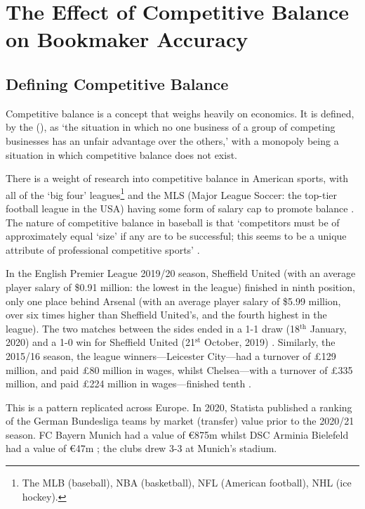 \documentclass[a4paper,10pt]{report}
\begin{document}
\section{The Effect of Competitive Balance on Bookmaker Accuracy}\label{sec:elitecompbal}

\subsection{Defining Competitive Balance}
Competitive balance is a concept that weighs heavily on economics. It is defined, by the \citeauthor{CompetitiveBalance} (\citeyear{CompetitiveBalance}), as `the situation in which no one business of a group of competing businesses has an unfair advantage over the others,' with a monopoly being a situation in which competitive balance does not exist.

There is a weight of research into competitive balance in American sports, with all of the `big four' leagues\footnote{The MLB (baseball), NBA (basketball), NFL (American football), NHL (ice hockey).} and the MLS (Major League Soccer: the top-tier football league in the USA) having some form of salary cap to promote balance \autocite{MLBsalary, NBAsalary, NHLsalary, NFLsalary, MLSsalary}. The nature of competitive balance in baseball is that `competitors must be of approximately equal `size' if any are to be successful; this seems to be a unique attribute of professional competitive sports' \autocite{Rottenberg56}. 


In the English Premier League 2019/20 season, Sheffield United (with an average player salary of \$0.91 million: the lowest in the league) finished in ninth position, only one place behind Arsenal (with an average player salary of \$5.99 million, over six times higher than Sheffield United's, and the fourth highest in the league). The two matches between the sides ended in a 1-1 draw (18$^\textrm{th}$ January, 2020) and a 1-0 win for Sheffield United (21$^\textrm{st}$ October, 2019) \autocite{eplfinances2019, prem1920}. Similarly, the 2015/16 season, the league winners---Leicester City---had a turnover of £129 million, and paid £80 million in wages, whilst Chelsea---with a turnover of £335 million, and paid £224 million in wages---finished tenth \autocite{EplFinance17}.

This is a pattern replicated across Europe. In 2020, Statista published a ranking of the German Bundesliga teams by market (transfer) value prior to the 2020/21 season. FC Bayern Munich had a value of \euro{}875m whilst DSC Arminia Bielefeld had a value of \euro{}47m \autocite{BundesligaFinance20}; the clubs drew 3-3 at Munich's stadium. 
\end{document}
